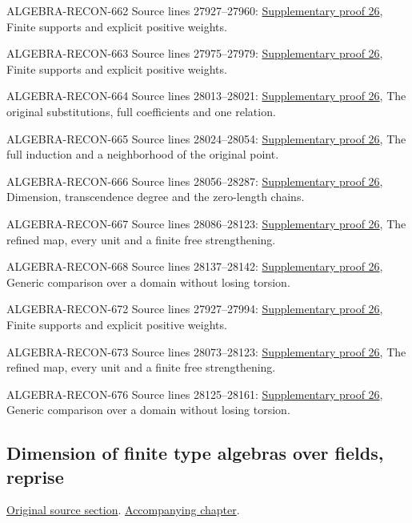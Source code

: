 \begin{AlgebraSourceRoutes}
\item[ALGEBRA-RECON-662] Source lines 27927--27960: \hyperlink{algebra_noether_dimension_notes_20260928}{Supplementary proof 26}, Finite supports and explicit positive weights.
\item[ALGEBRA-RECON-663] Source lines 27975--27979: \hyperlink{algebra_noether_dimension_notes_20260928}{Supplementary proof 26}, Finite supports and explicit positive weights.
\item[ALGEBRA-RECON-664] Source lines 28013--28021: \hyperlink{algebra_noether_dimension_notes_20260928}{Supplementary proof 26}, The original substitutions, full coefficients and one relation.
\item[ALGEBRA-RECON-665] Source lines 28024--28054: \hyperlink{algebra_noether_dimension_notes_20260928}{Supplementary proof 26}, The full induction and a neighborhood of the original point.
\item[ALGEBRA-RECON-666] Source lines 28056--28287: \hyperlink{algebra_noether_dimension_notes_20260928}{Supplementary proof 26}, Dimension, transcendence degree and the zero-length chains.
\item[ALGEBRA-RECON-667] Source lines 28086--28123: \hyperlink{algebra_noether_dimension_notes_20260928}{Supplementary proof 26}, The refined map, every unit and a finite free strengthening.
\item[ALGEBRA-RECON-668] Source lines 28137--28142: \hyperlink{algebra_noether_dimension_notes_20260928}{Supplementary proof 26}, Generic comparison over a domain without losing torsion.
\item[ALGEBRA-RECON-672] Source lines 27927--27994: \hyperlink{algebra_noether_dimension_notes_20260928}{Supplementary proof 26}, Finite supports and explicit positive weights.
\item[ALGEBRA-RECON-673] Source lines 28073--28123: \hyperlink{algebra_noether_dimension_notes_20260928}{Supplementary proof 26}, The refined map, every unit and a finite free strengthening.
\item[ALGEBRA-RECON-676] Source lines 28125--28161: \hyperlink{algebra_noether_dimension_notes_20260928}{Supplementary proof 26}, Generic comparison over a domain without losing torsion.
\end{AlgebraSourceRoutes}

\subsection{Dimension of finite type algebras over fields, reprise}
\hypertarget{algebra-source-section-dimension-finite-type-algebras-reprise}{}
\noindent\href{https://github.com/stacks/stacks-project/blob/a04446e57ec1fbc252a871afcec7752fb2807b14/algebra.tex\#L28167}{Original source section}. \href{algebra.pdf\#nameddest=section-dimension-finite-type-algebras-reprise}{Accompanying chapter}.

